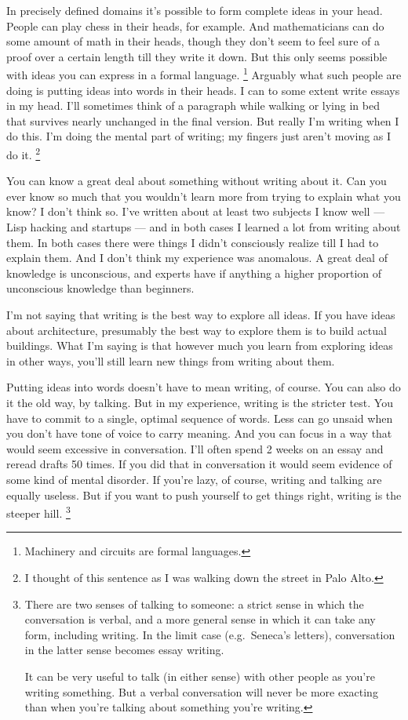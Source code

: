 \documentclass[12pt]{book}
\begin{document}
In precisely defined domains it's possible to form complete ideas in
your head. People can play chess in their heads, for example. And
mathematicians can do some amount of math in their heads, though they
don't seem to feel sure of a proof over a certain length till they write
it down. But this only seems possible with ideas you can express in a
formal language. \footnote{Machinery and circuits are formal languages.} Arguably what such people are
doing is putting ideas into words in their heads. I can to some extent
write essays in my head. I'll sometimes think of a paragraph while
walking or lying in bed that survives nearly unchanged in the final
version. But really I'm writing when I do this. I'm doing the mental
part of writing; my fingers just aren't moving as I do it.
\footnote{I thought of this sentence as I was walking down the street in
Palo Alto.}

You can know a great deal about something without writing about it. Can
you ever know so much that you wouldn't learn more from trying to
explain what you know? I don't think so. I've written about at least two
subjects I know well --- Lisp hacking and startups --- and in both cases
I learned a lot from writing about them. In both cases there were things
I didn't consciously realize till I had to explain them. And I don't
think my experience was anomalous. A great deal of knowledge is
unconscious, and experts have if anything a higher proportion of
unconscious knowledge than beginners.

I'm not saying that writing is the best way to explore all ideas. If you
have ideas about architecture, presumably the best way to explore them
is to build actual buildings. What I'm saying is that however much you
learn from exploring ideas in other ways, you'll still learn new things
from writing about them.

Putting ideas into words doesn't have to mean writing, of course. You
can also do it the old way, by talking. But in my experience, writing is
the stricter test. You have to commit to a single, optimal sequence of
words. Less can go unsaid when you don't have tone of voice to carry
meaning. And you can focus in a way that would seem excessive in
conversation. I'll often spend 2 weeks on an essay and reread drafts 50
times. If you did that in conversation it would seem evidence of some
kind of mental disorder. If you're lazy, of course, writing and talking
are equally useless. But if you want to push yourself to get things
right, writing is the steeper hill. \footnote{There are two senses of talking to someone: a strict sense in
which the conversation is verbal, and a more general sense in which it
can take any form, including writing. In the limit case (e.g.~Seneca's
letters), conversation in the latter sense becomes essay writing.

It can be very useful to talk (in either sense) with other people as
you're writing something. But a verbal conversation will never be more
exacting than when you're talking about something you're writing.}
\end{document}
